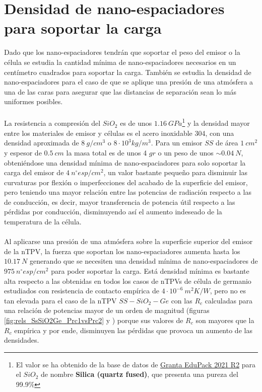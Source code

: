 \section{Densidad de nano-espaciadores para soportar la carga}\label{sec:densidad_carga}
Dado que los nano-espaciadores tendrán que soportar el peso del emisor o la célula se estudia la cantidad mínima de nano-espaciadores necesarios en un centímetro cuadrados para soportar la carga. También se estudia la densidad de nano-espaciadores para el caso de que se aplique una presión de una atmósfera a una de las caras para asegurar que las distancias de separación sean lo más uniformes posibles.\\\\
La resistencia a compresión del $SiO_2$ es de unos $1.16 \ GPa$\footnote{El valor se ha obtenido de la base de datos de \hyperref[sec:grantaEduPack]{Granta EduPack 2021 R2} para el $SiO_2$ de nombre \textbf{Silica (quartz fused)}, que presenta una pureza del 99.9\%} y la densidad mayor entre los materiales de emisor y células es el acero inoxidable 304, con una densidad aproximada de $8 \ g/cm^3$ o $8\cdot 10^3 kg/m^3$. Para un emisor $SS$ de área $1 \ cm^2$ y espesor de $0.5 \ cm$ la masa total es de unos 4 $gr$ o un peso de unos $\sim 0.04 \ N$, obteniéndose una densidad mínima de nano-espaciadores para solo soportar la carga del emisor de $4 \ n^{\circ}esp/cm^2$, un valor bastante pequeño para disminuir las curvaturas por flexión o imperfecciones del acabado de la superficie del emisor, pero teniendo una mayor relación entre las potencias de radiación respecto a las de conducción, es decir, mayor transferencia de potencia útil respecto a las pérdidas por conducción, disminuyendo así el aumento indeseado de la temperatura de la célula.\\\\
Al aplicarse una presión de una atmósfera sobre la superficie superior del emisor de la nTPV, la fuerza que soportan los nano-espaciadores aumenta hasta los $10.17 \ N$ generando que se necesiten una densidad mínima de nano-espaciadores de $975 \ n^{\circ}esp/cm^2$ para poder soportar la carga. Está densidad mínima es bastante alta respecto a las obtenidas en todos los casos de nTPVs de célula de germanio estudiados con resistencia de contacto empírica de $4\cdot 10^{-6} \ m^2 K/W$, pero no es tan elevada para el caso de la nTPV $SS-SiO_2-Ge$ con las $R_c$ calculadas para una relación de potencias mayor de un orden de magnitud (figuras \ref{fig:rels_SsSiO2Ge_Prc1vsPrc2}  y ) porque sus valores de $R_c$ son mayores que la $R_c$ empírica y por ende, disminuyen las pérdidas que provoca un aumento de las densidades.
